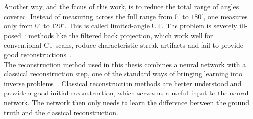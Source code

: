 \documentclass{article}
\numberwithin{equation}{section}
\begin{document}
Another way, and the focus of this work, is to reduce the total range of angles covered. Instead of measuring across the full range from $0^\circ$ to $180^\circ$,
one measures only from $0^\circ$ to $120^\circ$. This is called limited-angle CT\@. The problem is severely ill-posed~\parencite{davison1983illconditioned}:
methods like the filtered back projection, which work well for conventional CT scans, 
roduce characteristic streak artifacts and fail to provide good reconstructions~\parencite{CT-LA-CNN,frikel2013artifacts}.\\
The reconstruction method used in this thesis combines a neural network with a classical reconstruction step, one of the standard ways of bringing learning into inverse
problems~\parencite{arridge2019solving}. Classical reconstruction methods are better understood and provide a good initial reconstruction, which serves as a useful input to the neural network.
The network then only needs to learn the difference between the ground truth and the classical reconstruction.
\end{document}
